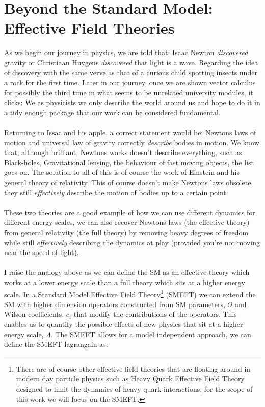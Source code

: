 \section{Beyond the Standard Model: Effective Field Theories}\label{sec:SMEFT}
As we begin our journey in physics, we are told that: Isaac Newton \textit{discovered} gravity or Christiaan Huygens \textit{discovered} that light is a wave. Regarding the idea of discovery with the same verve as that of a curious child spotting insects under a rock for the first time. Later in our journey, once we are shown vector calculus for possibly the third time in what seems to be unrelated university modules, it clicks: We as physicists we only describe the world around us and hope to do it in a tidy enough package that our work can be considered fundamental.\\
\\
Returning to Issac and his apple, a correct statement would be: Newtons laws of motion and universal law of gravity correctly \textit{describe} bodies in motion. We know that, although brilliant, Newtons works doesn’t describe everything, such as: Black-holes, Gravitational lensing, the behaviour of fast moving objects, the list goes on. The solution to all of this is of course the work of Einstein and his general theory of relativity. This of course doesn’t make Newtons laws obsolete, they still \textit{effectively} describe the motion of bodies up to a certain point.\\
\\
These two theories are a good example of how we can use different dynamics for different energy scales, we can also recover Newtons laws (the effective theory) from general relativity (the full theory) by removing heavy degrees of freedom while still \textit{effectively} describing the dynamics at play (provided you're not moving near the speed of light).
\\
\\
I raise the analogy above as we can define the SM as an effective theory which works at a lower energy scale than a full theory which sits at a higher energy scale. In a Standard Model Effective Field Theory\footnote{There are of course other effective field theories that are floating around in modern day particle physics such as Heavy Quark Effective Field Theory \cite{HQEFT} designed to limit the dynamics of heavy quark interactions, for the scope of this work we will focus on the SMEFT.} (SMEFT) \cite{SMEFT} we can extend the SM with higher dimension operators constructed from SM parameters, $\mathcal{O}$ and Wilson coefficients, $c_i$ that modify the contributions of the operators. This enables us to quantify the possible effects of new physics that sit at a higher energy scale, $\Lambda$. The SMEFT allows for a model independent approach, we can define the SMEFT lagrangain as:

